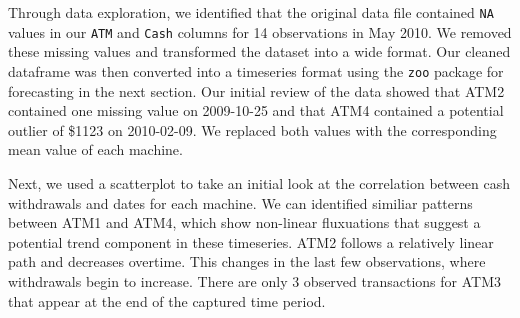 \documentclass[openany]{book}
\begin{document}
Through data exploration, we identified that the original data file contained \texttt{NA} values in our \texttt{ATM} and \texttt{Cash} columns for 14 observations in May 2010. We removed these missing values and transformed the dataset into a wide format. Our cleaned dataframe was then converted into a timeseries format using the \texttt{zoo} package for forecasting in the next section. Our initial review of the data showed that ATM2 contained one missing value on 2009-10-25 and that ATM4 contained a potential outlier of \$1123 on 2010-02-09. We replaced both values with the corresponding mean value of each machine.

Next, we used a scatterplot to take an initial look at the correlation between cash withdrawals and dates for each machine. We can identified similiar patterns between ATM1 and ATM4, which show non-linear fluxuations that suggest a potential trend component in these timeseries. ATM2 follows a relatively linear path and decreases overtime. This changes in the last few observations, where withdrawals begin to increase. There are only 3 observed transactions for ATM3 that appear at the end of the captured time period.
\end{document}
